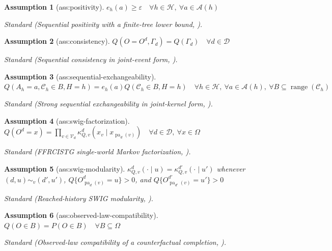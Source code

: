 \documentclass{article}
\newtheorem{assumption}{Assumption}
\begin{document}
\begin{assumption}[ass:positivity]\label{ass:positivity}
\(e_h(a)\geq\varepsilon\quad\forall h\in\mathcal H,\ \forall a\in\mathcal A(h)\)
\par\smallskip\noindent\emph{Standard} (Sequential positivity with a finite-tree lower bound, \cite{Shahn2026Oracle}).
\end{assumption}

\begin{assumption}[ass:consistency]\label{ass:consistency}
\(Q(O=O^d,\Gamma_d)=Q(\Gamma_d)\quad\forall d\in\mathcal D\)
\par\smallskip\noindent\emph{Standard} (Sequential consistency in joint-event form, \cite{Shahn2026Oracle}).
\end{assumption}

\begin{assumption}[ass:sequential-exchangeability]\label{ass:sequential-exchangeability}
\(Q(A_h=a,\mathcal C_h\in B,H=h)=e_h(a)Q(\mathcal C_h\in B,H=h)\quad\forall h\in\mathcal H,\ \forall a\in\mathcal A(h),\ \forall B\subseteq\operatorname{range}(\mathcal C_h)\)
\par\smallskip\noindent\emph{Standard} (Strong sequential exchangeability in joint-kernel form, \cite{Shahn2026Oracle}).
\end{assumption}

\begin{assumption}[ass:swig-factorization]\label{ass:swig-factorization}
\(Q(O^d=x)=\prod_{v\in\mathcal V_d}\kappa^d_{Q,v}(x_v\mid x_{\operatorname{pa}_d(v)})\quad\forall d\in\mathcal D,\ \forall x\in\Omega\)
\par\smallskip\noindent\emph{Standard} (FFRCISTG single-world Markov factorization, \cite{RichardsonRobins2013SWIG}).
\end{assumption}

\begin{assumption}[ass:swig-modularity]\label{ass:swig-modularity}
\(\kappa^d_{Q,v}(\cdot\mid u)=\kappa^{d'}_{Q,v}(\cdot\mid u')\) whenever \((d,u)\sim_v(d',u')\), \(Q\{O^d_{\operatorname{pa}_d(v)}=u\}>0\), and \(Q\{O^{d'}_{\operatorname{pa}_{d'}(v)}=u'\}>0\)
\par\smallskip\noindent\emph{Standard} (Reached-history SWIG modularity, \cite{RichardsonRobins2013SWIG}).
\end{assumption}

\begin{assumption}[ass:observed-law-compatibility]\label{ass:observed-law-compatibility}
\(Q(O\in B)=P(O\in B)\quad\forall B\subseteq\Omega\)
\par\smallskip\noindent\emph{Standard} (Observed-law compatibility of a counterfactual completion, \cite{Shahn2026Oracle}).
\end{assumption}
\end{document}
